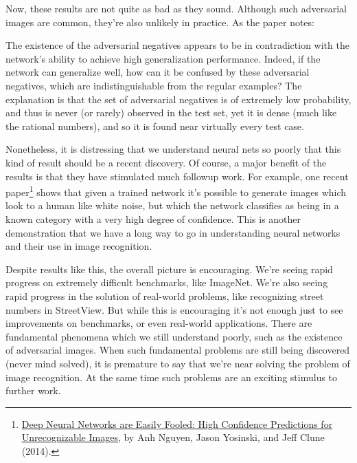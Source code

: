 \documentclass[a4paper,twoside,10pt]{book}
\begin{document}
Now, these results are not quite as bad as they sound. Although such adversarial images are common, they're also unlikely in practice. As the paper notes:
\begin{adjustwidth}{1.5cm}{0.5cm}
The existence of the adversarial negatives appears to be in contradiction with the network's ability to achieve high generalization performance. Indeed, if the network can generalize well, how can it be confused by these adversarial negatives, which are indistinguishable from the regular examples? The explanation is that the set of adversarial negatives is of extremely low probability, and thus is never (or rarely) observed in the test set, yet it is dense (much like the rational numbers), and so it is found near virtually every test case.
\end{adjustwidth}
Nonetheless, it is distressing that we understand neural nets so poorly that this kind of result should be a recent discovery. Of course, a major benefit of the results is that they have stimulated much followup work. For example, one recent paper\footnote{\href{http://arxiv.org/abs/1412.1897}{Deep Neural Networks are Easily Fooled: High Confidence Predictions for Unrecognizable Images}, by Anh Nguyen, Jason Yosinski, and Jeff Clune (2014).} shows that given a trained network it's possible to generate images which look to a human like white noise, but which the network classifies as being in a known category with a very high degree of confidence. This is another demonstration that we have a long way to go in understanding neural networks and their use in image recognition.

Despite results like this, the overall picture is encouraging. We're seeing rapid progress on extremely difficult benchmarks, like ImageNet. We're also seeing rapid progress in the solution of real-world problems, like recognizing street numbers in StreetView. But while this is encouraging it's not enough just to see improvements on benchmarks, or even real-world applications. There are fundamental phenomena which we still understand poorly, such as the existence of adversarial images. When such fundamental problems are still being discovered (never mind solved), it is premature to say that we're near solving the problem of image recognition. At the same time such problems are an exciting stimulus to further work.
\end{document}
